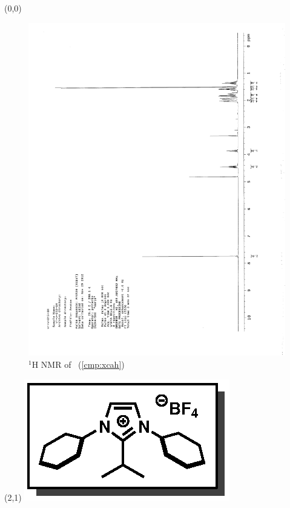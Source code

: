\begin{textblock}{20}(0,0)
\begin{figure}[htb]
\caption{$^1$H NMR of \CMPxcah\ (\ref{cmp:xcah})}
\includegraphics[scale=0.75, trim = 0mm 0mm 0mm 5mm,
clip]{chp_alkylation/images/nmr/xcahH}
\vspace{-100pt}
\end{figure}
\end{textblock}
\begin{textblock}{1}(2,1)
\includegraphics[scale=0.8, angle=90]{chp_alkylation/images/xcah}
\end{textblock}
